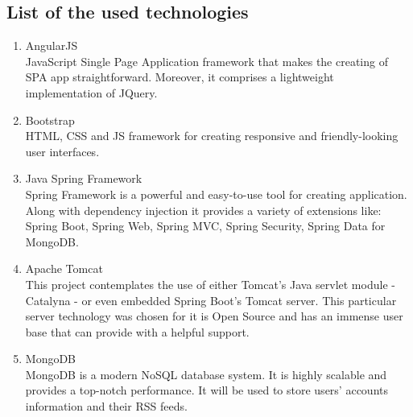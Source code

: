 \documentclass[]{article}
\begin{document}
\subsection{List of the used technologies}
\begin{enumerate}
	\item AngularJS\\
	JavaScript Single Page Application framework that makes the creating of SPA app straightforward. Moreover, it comprises a lightweight implementation of JQuery.
	
	\item Bootstrap\\
	HTML, CSS and JS framework for creating responsive and friendly-looking user interfaces.
	
	\item Java Spring Framework\\
	Spring Framework is a powerful and easy-to-use tool for creating application. Along with dependency injection it provides a variety of extensions like: Spring Boot, Spring Web, Spring MVC, Spring Security, Spring Data for MongoDB.
	
	\item Apache Tomcat\\
	This project contemplates the use of either Tomcat's Java servlet module - Catalyna - or even embedded Spring Boot's Tomcat server. This particular server technology was chosen for it is Open Source and has an immense user base that can provide with a helpful support.
	
	\item MongoDB\\
	MongoDB is a modern NoSQL database system. It is highly scalable and provides a top-notch performance. It will be used to store users' accounts information and their RSS feeds.
	
	
\end{enumerate}
\end{document}
